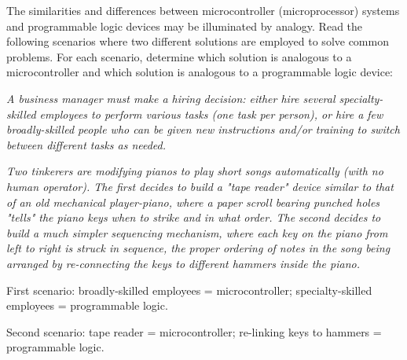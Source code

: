 

The similarities and differences between microcontroller (microprocessor) systems and programmable logic devices may be illuminated by analogy.  Read the following scenarios where two different solutions are employed to solve common problems.  For each scenario, determine which solution is analogous to a microcontroller and which solution is analogous to a programmable logic device:

\vskip 10pt {\narrower \noindent \baselineskip5pt

{\it A business manager must make a hiring decision: either hire several specialty-skilled employees to perform various tasks (one task per person), or hire a few broadly-skilled people who can be given new instructions and/or training to switch between different tasks as needed.}

\par} \vskip 10pt

\vskip 10pt {\narrower \noindent \baselineskip5pt

{\it Two tinkerers are modifying pianos to play short songs automatically (with no human operator).  The first decides to build a "tape reader" device similar to that of an old mechanical player-piano, where a paper scroll bearing punched holes "tells" the piano keys when to strike and in what order.  The second decides to build a much simpler sequencing mechanism, where each key on the piano from left to right is struck in sequence, the proper ordering of notes in the song being arranged by re-connecting the keys to different hammers inside the piano.}

\par} \vskip 10pt







First scenario: broadly-skilled employees = microcontroller; specialty-skilled employees = programmable logic.

\vskip 10pt

Second scenario: tape reader = microcontroller; re-linking keys to hammers = programmable logic.







